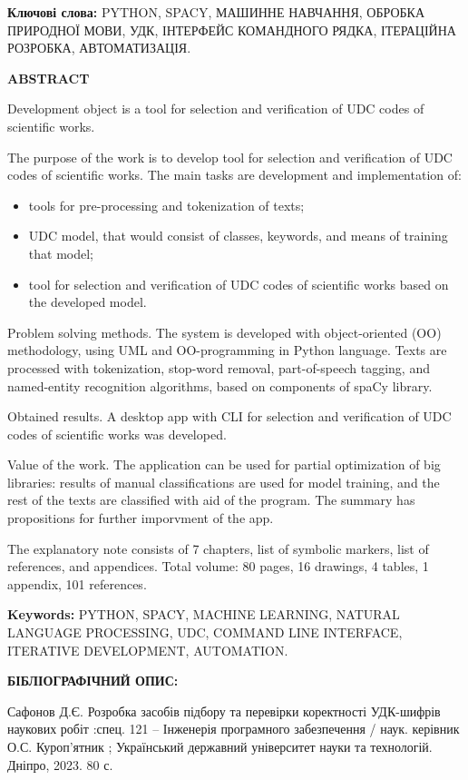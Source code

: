 \documentclass[14pt]{extarticle}
\begin{document}
\textbf{Ключові слова:} \MakeUppercase{python, spaCy, машинне навчання, обробка природної мови,
УДК, інтерфейс командного рядка, ітераційна розробка, автоматизація.}

\newpage

\noindent
\textbf{ABSTRACT}

Development object is a tool for selection and
verification of UDC codes of scientific works.

The purpose of the work is to develop tool for selection and
verification of UDC codes of scientific works. The main tasks are development
and implementation of:

\begin{itemize}[itemsep=1pt,labelindent=\dimexpr{}\relax, leftmargin=*]
  \item tools for pre-processing and tokenization of texts;
  \item UDC model, that would consist of classes, keywords, and means of
	training that model;
  \item tool for selection and verification of UDC codes of scientific works
	based on the developed model.
\end{itemize}

Problem solving methods. The system is developed with object-oriented (OO)
methodology, using UML and OO-programming in Python language.
Texts are processed with tokenization, stop-word removal, part-of-speech tagging,
and named-entity recognition algorithms, based on components of spaCy library.

Obtained results. A desktop app with CLI for selection and
verification of UDC codes of scientific works was developed.

Value of the work. The application can be used for partial optimization of
big libraries: results of manual classifications are used for model training,
and the rest of the texts are classified with aid of the program.
The summary has propositions for further imporvment of the app.

The explanatory note consists of 7 chapters, list of symbolic markers,
list of references, and appendices.
Total volume: 80 pages, 16 drawings, 4 tables, 1 appendix, 101 references.

\textbf{Keywords:} \MakeUppercase{python, spaCy, machine learning,
Natural language processing,
UDC, command line interface, iterative development, automation.}

\newpage
\noindent
\textbf{БІБЛІОГРАФІЧНИЙ ОПИС:}

Сафонов Д.Є.
Розробка засобів підбору та перевірки коректності УДК-шифрів наукових
робіт
:спец. 121 – Інженерія програмного забезпечення
/ наук. керівник О.С. Куроп'ятник ;
Український державний університет науки та технологій. Дніпро, 2023. 80 с.
\end{document}
